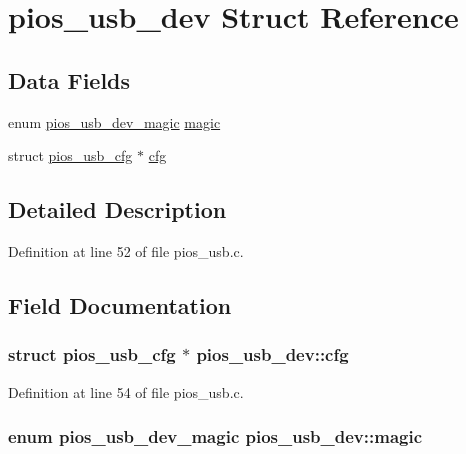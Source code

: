 \hypertarget{structpios__usb__dev}{\section{pios\-\_\-usb\-\_\-dev Struct Reference}
\label{structpios__usb__dev}
}
\subsection*{Data Fields}
\begin{DoxyCompactItemize}
\item 
enum \hyperlink{group___p_i_o_s___u_s_b_ga388809c6af586364da35c0e34ddd2a53}{pios\-\_\-usb\-\_\-dev\-\_\-magic} \hyperlink{structpios__usb__dev_a0613ccfe031d6ee209961aa2b3b3d69a}{magic}
\item 
struct \hyperlink{structpios__usb__cfg}{pios\-\_\-usb\-\_\-cfg} $\ast$ \hyperlink{structpios__usb__dev_a250e0e84a6143b57b95e939193a1cd52}{cfg}
\end{DoxyCompactItemize}


\subsection{Detailed Description}


Definition at line 52 of file pios\-\_\-usb.\-c.



\subsection{Field Documentation}
\hypertarget{structpios__usb__dev_a250e0e84a6143b57b95e939193a1cd52}{
\subsubsection[{cfg}]{\setlength{\rightskip}{0pt plus 5cm}struct {\bf pios\-\_\-usb\-\_\-cfg} $\ast$ pios\-\_\-usb\-\_\-dev\-::cfg}}\label{structpios__usb__dev_a250e0e84a6143b57b95e939193a1cd52}


Definition at line 54 of file pios\-\_\-usb.\-c.

\hypertarget{structpios__usb__dev_a0613ccfe031d6ee209961aa2b3b3d69a}{
\subsubsection[{magic}]{\setlength{\rightskip}{0pt plus 5cm}enum {\bf pios\-\_\-usb\-\_\-dev\-\_\-magic} pios\-\_\-usb\-\_\-dev\-::magic}}\label{structpios__usb__dev_a0613ccfe031d6ee209961aa2b3b3d69a}


